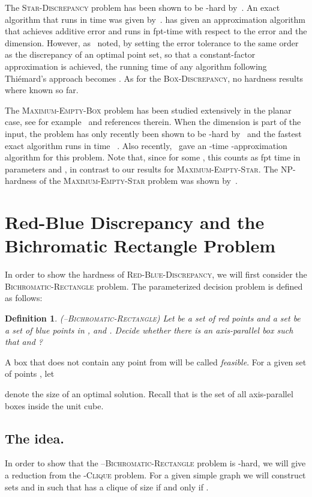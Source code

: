 \documentclass[12pt]{article}
\newtheorem{definition}{Definition}
\begin{document}
The \textsc{Star-Discrepancy} problem has been shown to be -hard by~\cite{GSW09}.  An exact algorithm that runs in  time was given
by~\cite{DEM96}. \cite{DBLP:journals/jc/Thiemard01} has given
an approximation algorithm that achieves additive error and runs in
fpt-time with respect to the error and the dimension. However, as~\cite{DBLP:journals/jc/Gnewuch08} noted, by setting the error
tolerance to the same order as the discrepancy of an optimal point set, so
that a constant-factor approximation is achieved, the running time of any
algorithm following Thi\'emard's approach becomes . 
As for the \textsc{Box-Discrepancy}, no hardness results where known so far.

The \textsc{Maximum-Empty-Box} problem has been studied extensively in the
planar case, see for example~\cite{AS87} and references
therein.  When the dimension is part of the input, the problem has only
recently been shown to be -hard by~\cite{BK10} and the fastest exact
algorithm runs in time ~\cite{BK10}. 
Also recently,~\cite{DJ09} gave an -time -approximation algorithm for this problem.
Note that, since  for some , this counts as fpt time 
in parameters  and , in contrast to our results for \textsc{Maximum-Empty-Star}.
The NP-hardness of the \textsc{Maximum-Empty-Star} problem was shown by~\cite{GSW09}. 




\section{Red-Blue Discrepancy and the Bichromatic Rectangle Problem}\label{Sec:BichromaticRectangle}
In order to show the hardness of \textsc{Red-Blue-Discrepancy}, we will first consider the \textsc{Bichromatic-Rectangle} problem. The parameterized decision problem is defined as follows:
\begin{definition} (--\textsc{Bichromatic-Rectangle})
Let  be a set of red points and a set  be a set of blue points in , and . Decide whether there is an axis-parallel box such that  and ? 
\end{definition}

A box that does not contain any point from  will be called \emph{feasible}. For a given set of points , let 

denote the size of an optimal solution. Recall that  is the set of all axis-parallel boxes inside the unit cube.

\subsection{The idea.}
In order to show that the --\textsc{Bichromatic-Rectangle} problem
is -hard, we will give a reduction from the -\textsc{Clique} problem. For a given simple graph  we will construct sets
 and  in  such that  has a clique of size
 if and only if .
\end{document}
